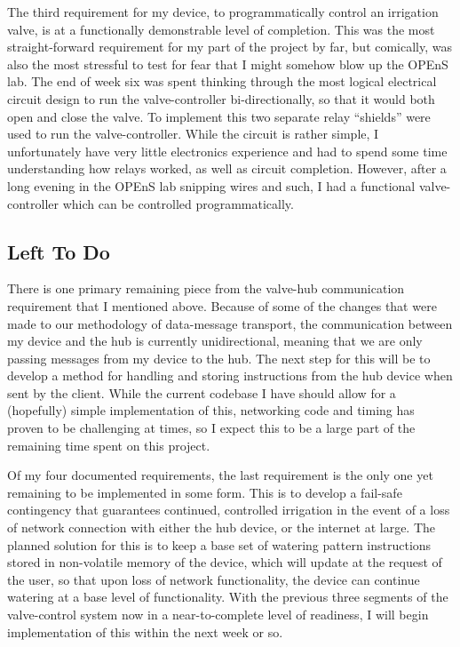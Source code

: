 \documentclass[onecolumn, draftclsnofoot,10pt, compsoc]{IEEEtran}
\begin{document}
The third requirement for my device, to programmatically control an irrigation valve, is at a functionally demonstrable level of completion.
This was the most straight-forward requirement for my part of the project by far, but comically, was also the most stressful to test for fear that I might somehow blow up the OPEnS lab.
The end of week six was spent thinking through the most logical electrical circuit design to run the valve-controller bi-directionally, so that it would both open and close the valve.
To implement this two separate relay “shields” were used to run the valve-controller.
While the circuit is rather simple, I unfortunately have very little electronics experience and had to spend some time understanding how relays worked, as well as circuit completion.
However, after a long evening in the OPEnS lab snipping wires and such, I had a functional valve-controller which can be controlled programmatically.

    \subsection{Left To Do}%
    There is one primary remaining piece from the valve-hub communication requirement that I mentioned above.
Because of some of the changes that were made to our methodology of data-message transport, the communication between my device and the hub is currently unidirectional, meaning that we are only passing messages from my device to the hub.
The next step for this will be to develop a method for handling and storing instructions from the hub device when sent by the client.
While the current codebase I have should allow for a (hopefully) simple implementation of this, networking code and timing has proven to be challenging at times, so I expect this to be a large part of the remaining time spent on this project.

Of my four documented requirements, the last requirement is the only one yet remaining to be implemented in some form.
This is to develop a fail-safe contingency that guarantees continued, controlled irrigation in the event of a loss of network connection with either the hub device, or the internet at large.
The planned solution for this is to keep a base set of watering pattern instructions stored in non-volatile memory of the device, which will update at the request of the user, so that upon loss of network functionality, the device can continue watering at a base level of functionality.
With the previous three segments of the valve-control system now in a near-to-complete level of readiness, I will begin implementation of this within the next week or so.
\end{document}
